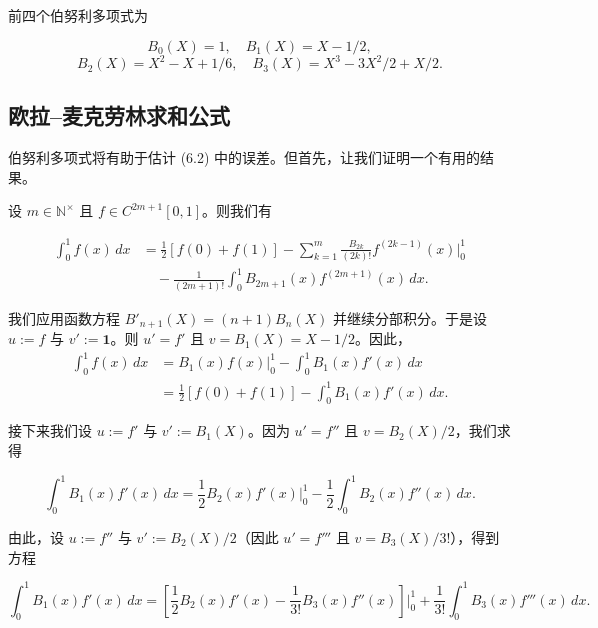 \begin{corollary}

前四个伯努利多项式为

\[
B_0(X) = 1 , \quad B_1(X) = X - 1/2 ,
\]
\[
B_2(X) = X^2 - X + 1/6 , \quad B_3(X) = X^3 - 3X^2/2 + X/2 .
\]
\end{corollary}

\subsection*{欧拉–麦克劳林求和公式}

伯努利多项式将有助于估计 (6.2) 中的误差。但首先，让我们证明一个有用的结果。

\begin{lemma}

设 $ m \in \mathbb{N}^\times $ 且 $ f \in C^{2m+1}[0, 1] $。则我们有

\begin{equation*}
\begin{aligned}
\int_0^1 f(x)\,dx &= \frac{1}{2}[f(0) + f(1)] - \sum_{k=1}^{m}\frac{B_{2k}}{(2k)!}f^{(2k-1)}(x)\Big|_0^1 \\ &\quad - \frac{1}{(2m+1)!}\int_0^1 B_{2m+1}(x)f^{(2m+1)}(x)\,dx .
\end{aligned}
\end{equation*}

\proofhead
我们应用函数方程 $ B'_{n+1}(X) = (n+1)B_n(X) $ 并继续分部积分。于是设 $ u := f $ 与 $ v' := \mathbf{1} $。则 $ u' = f' $ 且 $ v = B_1(X) = X - 1/2 $。因此，
\begin{equation}
\begin{aligned}
\int_0^1 f(x)\,dx &= B_1(x)f(x)\big|_0^1 - \int_0^1 B_1(x)f'(x)\,dx \\ &= \frac{1}{2}[f(0) + f(1)] - \int_0^1 B_1(x)f'(x)\,dx .
\end{aligned}\tag{6.6}
\end{equation}

接下来我们设 $ u := f' $ 与 $ v' := B_1(X) $。因为 $ u' = f'' $ 且 $ v = B_2(X)/2 $，我们求得

\[
\int_0^1 B_1(x)f'(x)\,dx = \frac{1}{2}B_2(x)f'(x)\Big|_0^1 - \frac{1}{2}\int_0^1 B_2(x)f''(x)\,dx .
\]

由此，设 $ u := f'' $ 与 $ v' := B_2(X)/2 $（因此 $ u' = f''' $ 且 $ v = B_3(X)/3! $），得到方程

\[
\int_0^1 B_1(x)f'(x)\,dx = \left[ \frac{1}{2}B_2(x)f'(x) - \frac{1}{3!}B_3(x)f''(x) \right]\Big|_0^1 + \frac{1}{3!}\int_0^1 B_3(x)f'''(x)\,dx .
\]


\end{lemma}
